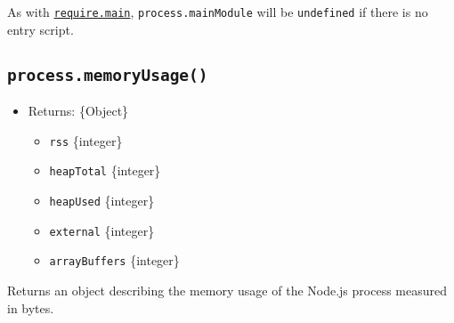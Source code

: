 As with
\href{modules.md\#accessing-the-main-module}{\texttt{require.main}},
\texttt{process.mainModule} will be \texttt{undefined} if there is no
entry script.

\subsection{\texorpdfstring{\texttt{process.memoryUsage()}}{process.memoryUsage()}}\label{process.memoryusage}

\begin{itemize}
\tightlist
\item
  Returns: \{Object\}

  \begin{itemize}
  \tightlist
  \item
    \texttt{rss} \{integer\}
  \item
    \texttt{heapTotal} \{integer\}
  \item
    \texttt{heapUsed} \{integer\}
  \item
    \texttt{external} \{integer\}
  \item
    \texttt{arrayBuffers} \{integer\}
  \end{itemize}
\end{itemize}

Returns an object describing the memory usage of the Node.js process
measured in bytes.

\begin{Shaded}
\begin{Highlighting}[]
 \OperatorTok{;}

\NormalTok{(}\NormalTok{())}\OperatorTok{;}
\CommentTok{// \{}
\CommentTok{// \}}
\end{Highlighting}
\end{Shaded}

\begin{Shaded}
\begin{Highlighting}[]
\OperatorTok{=} \NormalTok{(}\NormalTok{)}\OperatorTok{;}

\NormalTok{(}\NormalTok{())}\OperatorTok{;}
\CommentTok{// \{}
\CommentTok{// \}}
\end{Highlighting}
\end{Shaded}

